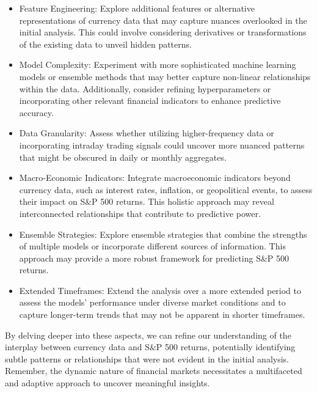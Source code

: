 \begin{itemize}
    \item Feature Engineering: Explore additional features or alternative representations of currency data that may capture nuances overlooked in the initial analysis. This could involve considering derivatives or transformations of the existing data to unveil hidden patterns.
    \item Model Complexity: Experiment with more sophisticated machine learning models or ensemble methods that may better capture non-linear relationships within the data. Additionally, consider refining hyperparameters or incorporating other relevant financial indicators to enhance predictive accuracy.
    \item Data Granularity: Assess whether utilizing higher-frequency data or incorporating intraday trading signals could uncover more nuanced patterns that might be obscured in daily or monthly aggregates.
    \item Macro-Economic Indicators: Integrate macroeconomic indicators beyond currency data, such as interest rates, inflation, or geopolitical events, to assess their impact on S\&P 500 returns. This holistic approach may reveal interconnected relationships that contribute to predictive power.
    \item Ensemble Strategies: Explore ensemble strategies that combine the strengths of multiple models or incorporate different sources of information. This approach may provide a more robust framework for predicting S\&P 500 returns.
    \item Extended Timeframes: Extend the analysis over a more extended period to assess the models' performance under diverse market conditions and to capture longer-term trends that may not be apparent in shorter timeframes.
\end{itemize}

By delving deeper into these aspects, we can refine our understanding of the interplay between currency data and S&P 500 returns, potentially identifying subtle patterns or relationships that were not evident in the initial analysis. Remember, the dynamic nature of financial markets necessitates a multifaceted and adaptive approach to uncover meaningful insights.
